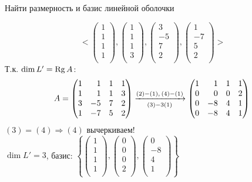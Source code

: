 \begin{prim}
	Найти размерность и базис линейной оболочки
\end{prim}
$$
<
\begin{pmatrix}
1\\ 
1\\ 
1\\ 
1\\
\end{pmatrix}
,
\begin{pmatrix}
1\\ 
1\\ 
1\\ 
3\\
\end{pmatrix}
,
\begin{pmatrix}
3\\ 
-5\\ 
7\\ 
2\\
\end{pmatrix}
,
\begin{pmatrix}
1\\ 
-7\\ 
5\\ 
2\\
\end{pmatrix}
>
$$
Т.к. $\dim L'=\operatorname{\mathop{Rg}} A$:
$$
A=
\begin{pmatrix*}[r]
1 & 1 & 1 & 1 \\
1 & 1 & 1 & 3 \\
3 & -5 & 7 & 2 \\
1 & -7 & 5 & 2 \\ 
\end{pmatrix*} 
\xrightarrow[(3)-3(1)]{ %
	(2)-(1),\\
	(4)-(1)}
\begin{pmatrix*}[r]
1 & 1 & 1 & 1 \\
0 & 0 & 0 & 2 \\
0 & -8 & 4 & 1 \\
0 & -8 & 4 & 1 \\ 
\end{pmatrix*} \\
$$
$(3)=(4) \Rightarrow (4)$ вычеркиваем!\\
$\dim  L'=3$, базис: $
\left\{
\begin{pmatrix}
1\\ 
1\\ 
1\\ 
1\\
\end{pmatrix}
,
\begin{pmatrix}
0\\ 
0\\ 
0\\ 
2\\
\end{pmatrix}
,
\begin{pmatrix}
0\\ 
-8\\ 
4\\ 
1\\
\end{pmatrix}
\right\}$

